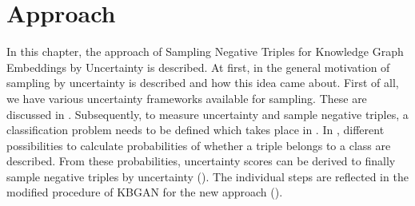 \chapter{Approach}
\label{ch:approach}
%
In this chapter, the approach of Sampling Negative Triples for Knowledge Graph Embeddings by Uncertainty is described.
At first, in  the general motivation of sampling by uncertainty is described and how this idea came about.
First of all, we have various uncertainty frameworks available for sampling.
These are discussed in .
Subsequently, to measure uncertainty and sample negative triples, a classification problem needs to be defined which takes place in .
In , different possibilities to calculate probabilities of whether a triple belongs to a class are described.
From these probabilities, uncertainty scores can be derived to finally sample negative triples by uncertainty ().
The individual steps are reflected in the modified procedure of \textsc{KBGAN} for the new approach ().







%